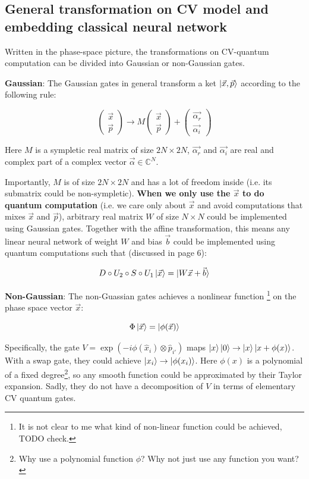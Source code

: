\documentclass{article}
\begin{document}
\subsection{ General transformation on CV model and embedding classical neural
network}

Written in the phase-space picture, the transformations on CV-quantum
computation can be divided into Gaussian or non-Gaussian gates.

\textbf{ Gaussian}:
The Gaussian gates in general transform a ket $\ket{\vec{x},\vec{p}}$ according
to the following rule:

$$ 
\begin{pmatrix}
  \vec{x} \\ \vec{p}
\end{pmatrix}
\to 
M \begin{pmatrix}
  \vec{x} \\ \vec{p}
\end{pmatrix}
+ 
\begin{pmatrix}
  \vec{\alpha_r}\\ \vec{\alpha_i}
\end{pmatrix}
$$

Here $M$ is a sympletic real matrix of size $2N\times 2N$, $\vec{\alpha_r}$
and $\vec{\alpha_i}$ are real and complex part of a complex vector
$\vec{\alpha}\in \mathbb{C}^{N}$. 

Importantly, $M$ is of size $2N\times 2N$ and has a lot of freedom inside (i.e.
its submatrix could be non-sympletic). \textbf{When we only use the $\vec{x}$ to
do quantum computation} (i.e. we care only about $\vec{x}$ and avoid computations
that mixes $\vec{x}$ and $\vec{p}$), arbitrary real matrix $W$ of size $N\times
N$ could be implemented using Gaussian gates. Together with the affine
transformation, this means any linear neural network of weight $W$ and bias
$\vec{b}$ could be implemented using quantum computations such that (discussed
in page 6):

$$
D\circ U_2 \circ S \circ U_1 \ket{\vec{x}} = \ket{W\vec{x} + \vec{b}}
$$


\textbf{Non-Gaussian}: The non-Guassian gates achieves a nonlinear function
\footnote{It is not clear to me what kind of non-linear function could be
achieved, TODO check.} on the phase space vector $\vec{x}$:

$$
\Phi \ket{\vec{x}} = \ket{\phi(\vec{x})}
$$

Specifically, the gate $V = \exp(-i \phi(\hat{x}_i)\otimes \hat{p}_{i'})$ maps
$\ket{x}\ket{0} \to \ket{x}\ket{x+\phi(x)}$. With a swap gate, they could
achieve $\ket{x_i} \to \ket{\phi(x_i)}$. Here $\phi(x)$ is a polynomial of a
fixed degree\footnote{Why use a polynomial function $\phi$? Why not just use any
function you want?}, so any smooth function could be approximated by their
Taylor expansion. Sadly, they do not have a decomposition of $V$ in terms of
elementary CV quantum gates.
\end{document}
